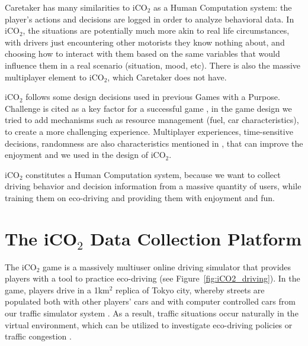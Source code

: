 \documentclass[preprint,authoryear,12pt]{elsarticle}
\begin{document}
Caretaker has many similarities to iCO$_2$ as a Human Computation system: the player's actions and decisions are logged in order to analyze behavioral data.
In iCO$_2$, the situations are potentially much more akin to real life circumstances, with drivers just encountering other motorists they know nothing about, and choosing how to interact with them based on the same variables that would influence them in a real scenario (situation, mood, etc). There is also the massive multiplayer element to iCO$_2$, which Caretaker does not have.



iCO$_2$ follows some design decisions used in previous Games with a Purpose. Challenge is cited as a key factor for a successful game \cite{vonAhn.2008}, in the game design we tried to add mechanisms such as resource management (fuel, car characteristics), to create a more challenging experience. Multiplayer experiences, time-sensitive decisions, randomness are also characteristics mentioned in \cite{vonAhn.2008}, that can improve the enjoyment and we used in the design of iCO$_2$.

iCO$_2$ constitutes a Human Computation system, because we want to collect driving behavior and decision information from a massive quantity of users, while training them on eco-driving and providing them with enjoyment and fun.


\section{The iCO$_2$ Data Collection Platform}\label{sec:platform}

The iCO$_2$ game is a massively multiuser online driving simulator that provides players with a tool to practice eco-driving (see Figure~\ref{fig:iCO2_driving}). In the game, players drive in a 1km$^2$ replica of Tokyo city, whereby streets are populated both with other players' cars and with computer controlled cars from our traffic simulator system \citep{Prendinger+others.2014}. As a result, traffic situations occur naturally in the virtual environment, which can be utilized to investigate eco-driving policies \citep{Prendinger+others.2013} or traffic congestion \citep{Gajananan+others.2013}.
\end{document}
